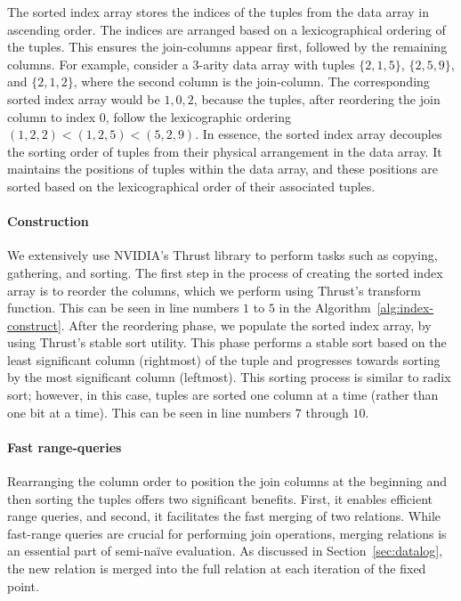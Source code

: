 \documentclass[nonacm,sigplan]{acmart}
\begin{document}
The sorted index array stores the indices of the tuples from the data array in ascending order. The indices are arranged based on a lexicographical ordering of the tuples. This ensures the join-columns appear first, followed by the remaining columns. For example, consider a $3$-arity data array with tuples $\{2,1,5\}$, $\{2,5,9\}$, and $\{2,1,2\}$, where the second column is the join-column. The corresponding sorted index array would be $1, 0, 2$, because the tuples, after reordering the join column to index 0, follow the lexicographic ordering $(1,2,2) < (1,2,5) < (5,2,9)$. In essence, the sorted index array decouples the sorting order of tuples from their physical arrangement in the data array. It maintains the positions of tuples within the data array, and these positions are sorted based on the lexicographical order of their associated tuples.

\paragraph*{Construction}
We extensively use NVIDIA's Thrust library \cite{thrust} to perform tasks such as copying, gathering, and sorting. The first step in the process of creating the sorted index array is to reorder the columns, which we perform using Thrust's transform function. This can be seen in line numbers $1$ to $5$ in the Algorithm~\ref{alg:index-construct}. After the reordering phase, we populate the sorted index array, by using Thrust's stable sort utility. This phase performs a stable sort based on the least significant column (rightmost) of the tuple and progresses towards sorting by the most significant column (leftmost). This sorting process is similar to radix sort; however, in this case, tuples are sorted one column at a time (rather than one bit at a time). This can be seen in line numbers $7$ through $10$.

\paragraph*{Fast range-queries}
Rearranging the column order to position the join columns at the beginning and then sorting the tuples offers two significant benefits. First, it enables efficient range queries, and second, it facilitates the fast merging of two relations. While fast-range queries are crucial for performing {join} operations, merging relations is an essential part of semi-na\"ive evaluation. As discussed in Section~\ref{sec:datalog}, the new relation is merged into the full relation at each iteration of the fixed point.
\end{document}
